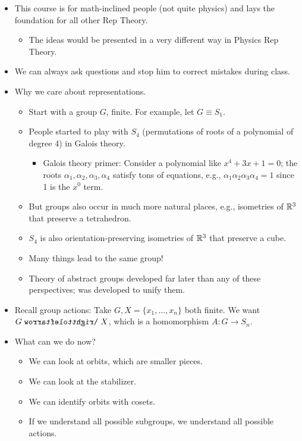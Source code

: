 \documentclass[../notes.tex]{subfiles}
\begin{document}
\begin{itemize}
    \item This course is for math-inclined people (not quite physics) and lays the foundation for all other Rep Theory.
    \begin{itemize}
        \item The ideas would be presented in a very different way in Physics Rep Theory.
    \end{itemize}
    \item We can always ask questions and stop him to correct mistakes during class.
    \item Why we care about representations.
    \begin{itemize}
        \item Start with a group $G$, finite. For example, let $G\equiv S_1$.
        \item People started to play with $S_4$ (permutations of roots of a polynomial of degree 4) in Galois theory.
        \begin{itemize}
            \item Galois theory primer: Consider a polynomial like $x^4+3x+1=0$; the roots $\alpha_1,\alpha_2,\alpha_3,\alpha_4$ satisfy tons of equations, e.g., $\alpha_1\alpha_2\alpha_3\alpha_4=1$ since 1 is the $x^0$ term.
        \end{itemize}
        \item But groups also occur in much more natural places, e.g., isometries of $\mathbb{R}^3$ that preserve a tetrahedron.
        \item $S_4$ is also orientation-preserving isometries of $\mathbb{R}^3$ that preserve a cube.
        \item Many things lead to the same group!
        \item Theory of abstract groups developed far later than any of these perspectives; was developed to unify them.
    \end{itemize}
    \item Recall group actions: Take $G,X=\{x_1,\dots,x_n\}$ both finite. We want $G\acts X$, which is a homomorphism $A:G\to S_n$.
    \item What can we do now?
    \begin{itemize}
        \item We can look at orbits, which are smaller pieces.
        \item We can look at the stabilizer.
        \item We can identify orbits with cosets.
        \item If we understand all possible subgroups, we understand all possible actions.

\end{itemize}
\end{itemize}
\end{document}
